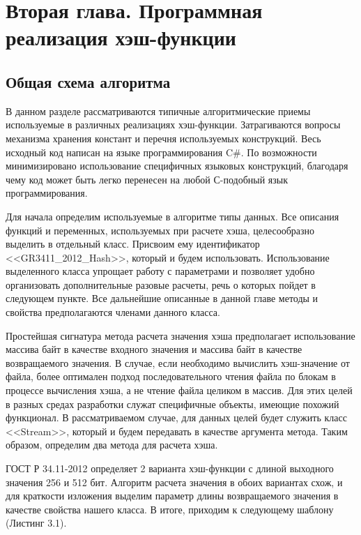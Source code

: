 \chapter{Вторая глава. Программная реализация хэш-функции}
\label{cha:ch_2}
\section{Общая схема алгоритма}
\par
В данном разделе рассматриваются типичные алгоритмические приемы используемые в различных реализациях хэш-функции. Затрагиваются вопросы механизма хранения констант и перечня используемых конструкций. Весь исходный код написан на языке программирования C\#. По возможности минимизировано использование специфичных языковых конструкций, благодаря чему код может быть легко перенесен на любой С-подобный язык программирования.
\par
Для начала определим используемые в алгоритме типы данных. Все описания функций и переменных, используемых при расчете хэша, целесообразно выделить в отдельный класс. Присвоим ему идентификатор <<GR3411\_2012\_Hash>>, который и будем использовать. Использование выделенного класса упрощает работу с параметрами и позволяет удобно организовать дополнительные разовые расчеты, речь о которых пойдет в следующем пункте. Все дальнейшие описанные в данной главе методы и свойства предполагаются членами данного класса.
\par
Простейшая сигнатура метода расчета значения хэша предполагает использование массива байт в качестве входного значения и массива байт в качестве возвращаемого значения. В случае, если необходимо вычислить хэш-значение от файла, более оптимален подход последовательного чтения файла по блокам в процессе вычисления хэша, а не чтение файла целиком в массив. Для этих целей в разных средах разработки служат специфичные объекты, имеющие похожий функционал. В рассматриваемом случае, для данных целей будет служить класс <<Stream>>, который и будем передавать в качестве аргумента метода.
Таким образом, определим два метода для расчета хэша.
\par ГОСТ Р 34.11-2012 определяет 2 варианта хэш-функции с длиной выходного значения 256 и 512 бит. Алгоритм расчета значения в обоих вариантах схож, и для краткости изложения выделим параметр длины возвращаемого значения в качестве свойства нашего класса. В итоге, приходим к следующему шаблону (Листинг 3.1).

\renewcommand{\lstlistingname}{Листинг}

